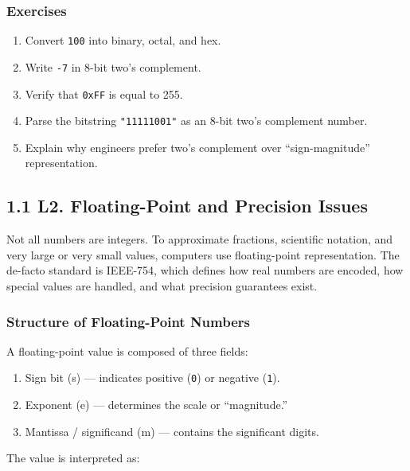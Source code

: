 \documentclass[
  letterpaper,
  DIV=11,
  numbers=noendperiod]{scrreprt}
\providecommand{\tightlist}{%
  \setlength{\itemsep}{0pt}\setlength{\parskip}{0pt}}
\begin{document}
\subsubsection{Exercises}\label{exercises-1}

\begin{enumerate}
\def\labelenumi{\arabic{enumi}.}
\tightlist
\item
  Convert \texttt{100} into binary, octal, and hex.
\item
  Write \texttt{-7} in 8-bit two's complement.
\item
  Verify that \texttt{0xFF} is equal to 255.
\item
  Parse the bitstring \texttt{"11111001"} as an 8-bit two's complement
  number.
\item
  Explain why engineers prefer two's complement over ``sign-magnitude''
  representation.
\end{enumerate}

\subsection{1.1 L2. Floating-Point and Precision
Issues}\label{l2.-floating-point-and-precision-issues}

Not all numbers are integers. To approximate fractions, scientific
notation, and very large or very small values, computers use
floating-point representation. The de-facto standard is IEEE-754, which
defines how real numbers are encoded, how special values are handled,
and what precision guarantees exist.

\subsubsection{Structure of Floating-Point
Numbers}\label{structure-of-floating-point-numbers}

A floating-point value is composed of three fields:

\begin{enumerate}
\def\labelenumi{\arabic{enumi}.}
\tightlist
\item
  Sign bit (s) --- indicates positive (\texttt{0}) or negative
  (\texttt{1}).
\item
  Exponent (e) --- determines the scale or ``magnitude.''
\item
  Mantissa / significand (m) --- contains the significant digits.
\end{enumerate}

The value is interpreted as:
\end{document}
